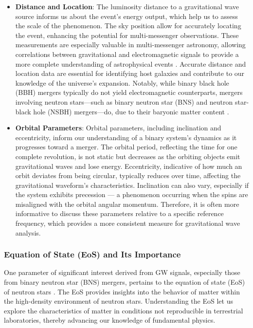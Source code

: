 \documentclass[12pt]{article}
\begin{document}
\begin{itemize}
   \item \textbf{Distance and Location}: The luminosity distance to a gravitational wave source informs us about the event's energy output, which help us to assess the scale of the phenomenon. The sky position allow for accurately locating the event, enhancing the potential for multi-messenger observations. These measurements are especially valuable in multi-messenger astronomy, allowing correlations between gravitational and electromagnetic signals to provide a more complete understanding of astrophysical events \cite{Multi-messenger Observations,Fairhurst2011}. Accurate distance and location data are essential for identifying host galaxies and contribute to our knowledge of the universe's expansion. Notably, while binary black hole (BBH) mergers typically do not yield electromagnetic counterparts, mergers involving neutron stars—such as binary neutron star (BNS) and neutron star-black hole (NSBH) mergers—do, due to their baryonic matter content \cite{Multi-messenger Observations}.


    \item \textbf{Orbital Parameters}: Orbital parameters, including inclination and eccentricity, inform our understanding of a binary system's dynamics as it progresses toward a merger. The orbital period, reflecting the time for one complete revolution, is not static but decreases as the orbiting objects emit gravitational waves and lose energy. Eccentricity, indicative of how much an orbit deviates from being circular, typically reduces over time, affecting the gravitational waveform's characteristics. Inclination can also vary, especially if the system exhibits precession — a phenomenon occurring when the spins are misaligned with the orbital angular momentum. Therefore, it is often more informative to discuss these parameters relative to a specific reference frequency, which provides a more consistent measure for gravitational wave analysis.


\end{itemize}


\subsubsection{Equation of State (EoS) and Its Importance}

One parameter of significant interest derived from GW signals, especially those from binary neutron star (BNS) mergers, pertains to the equation of state (EoS) of neutron stars \cite{EOS}. The EoS provides insights into the behavior of matter within the high-density environment of neutron stars. Understanding the EoS let us explore the characteristics of matter in conditions not reproducible in terrestrial laboratories, thereby advancing our knowledge of fundamental physics.
\end{document}
